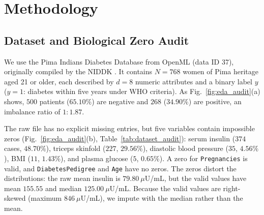 \documentclass[journal]{IEEEtran}
\begin{document}
\section{Methodology}\label{sec:method}

\subsection{Dataset and Biological Zero Audit}
We use the Pima Indians Diabetes Database from OpenML (data ID 37), originally compiled by the NIDDK \cite{smith1988using}. It contains $N = 768$ women of Pima heritage aged 21 or older, each described by $d = 8$ numeric attributes and a binary label $y$ ($y = 1$: diabetes within five years under WHO criteria). As Fig.~\ref{fig:eda_audit}(a) shows, $500$ patients ($65.10\%$) are negative and $268$ ($34.90\%$) are positive, an imbalance ratio of $1\!:\!1.87$.

The raw file has no explicit missing entries, but five variables contain impossible zeros (Fig.~\ref{fig:eda_audit}(b), Table~\ref{tab:dataset_audit}): serum insulin ($374$ cases, $48.70\%$), triceps skinfold ($227$, $29.56\%$), diastolic blood pressure ($35$, $4.56\%$), BMI ($11$, $1.43\%$), and plasma glucose ($5$, $0.65\%$). A zero for \texttt{Pregnancies} is valid, and \texttt{DiabetesPedigree} and \texttt{Age} have no zeros. The zeros distort the distributions: the raw mean insulin is $79.80\ \mu$U/mL, but the valid values have mean $155.55$ and median $125.00\ \mu$U/mL. Because the valid values are right-skewed (maximum $846\ \mu$U/mL), we impute with the median rather than the mean.
\end{document}
